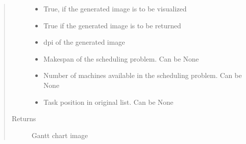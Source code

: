 \documentclass[letterpaper,10pt,english]{sphinxmanual}
\begin{document}
\begin{fulllineitems}
\begin{fulllineitems}
\begin{quote}
\begin{description}
\begin{itemize}
\item {} 
\sphinxAtStartPar
{} \textendash{} True, if the generated image is to be visualized

\item {} 
\sphinxAtStartPar
{} \textendash{} True if the generated image is to be returned

\item {} 
\sphinxAtStartPar
{} \textendash{} dpi of the generated image

\item {} 
\sphinxAtStartPar
{} \textendash{} Makespan of the scheduling problem. Can be None

\item {} 
\sphinxAtStartPar
{} \textendash{} Number of machines available in the scheduling problem. Can be None

\item {} 
\sphinxAtStartPar
{} \textendash{} Task position in original list. Can be None

\end{itemize}

\item[{Returns}] \leavevmode
\sphinxAtStartPar
Gantt chart image

\end{description}\end{quote}

\end{fulllineitems}



\end{fulllineitems}
\end{document}
